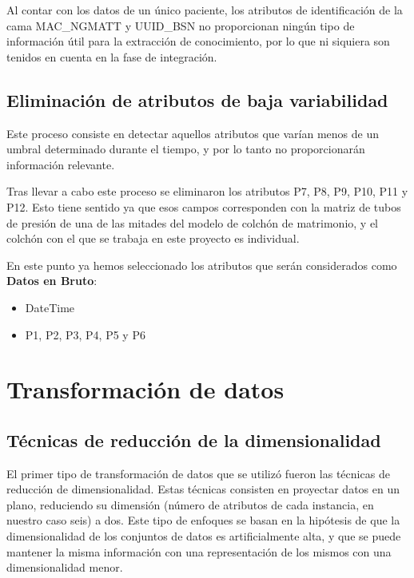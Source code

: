 Al contar con los datos de un único paciente, los atributos de identificación de la cama MAC\_NGMATT y UUID\_BSN no proporcionan ningún tipo de información útil para la extracción de conocimiento, por lo que ni siquiera son tenidos en cuenta en la fase de integración. 

\subsection{Eliminación de atributos de baja variabilidad}

Este proceso consiste en detectar aquellos atributos que varían menos de un umbral determinado durante el tiempo, y por lo tanto no proporcionarán información relevante. 

Tras llevar a cabo este proceso se eliminaron los atributos P7, P8, P9, P10, P11 y P12. Esto tiene sentido ya que esos campos corresponden con la matriz de tubos de presión de una de las mitades del modelo de colchón de matrimonio, y el colchón con el que se trabaja en este proyecto es individual. 

En este punto ya hemos seleccionado los atributos que serán considerados como \textbf{Datos en Bruto}: 
\begin{itemize}
	\item DateTime
	\item P1, P2, P3, P4, P5 y P6
\end{itemize}

\section{Transformación de datos}

\subsection{Técnicas de reducción de la dimensionalidad}

El primer tipo de transformación de datos que se utilizó fueron las técnicas de reducción de dimensionalidad. Estas técnicas consisten en proyectar datos en un plano, reduciendo su dimensión (número de atributos de cada instancia, en nuestro caso seis) a dos. Este tipo de enfoques se basan en la hipótesis de que la dimensionalidad de los conjuntos de datos es artificialmente alta, y que se puede mantener la misma información con una representación de los mismos con una dimensionalidad menor. 

